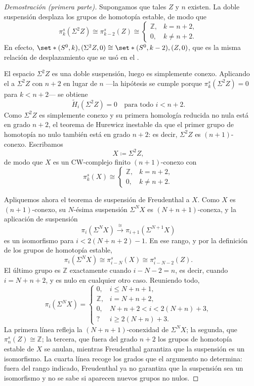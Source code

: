\begin{proof}[Demostración (primera parte)]
Supongamos que tales $Z$ y $n$ existen. La doble suspensión desplaza los grupos de homotopía estable, de modo que
\[
\pi_k^s(\Sigma^2Z)\cong\pi_{k-2}^s(Z)\cong
\begin{cases}
\mathbb Z, & k=n+2,\\
0, & k\neq n+2 .
\end{cases}
\]
En efecto, $\set*{(S^0,k),(\Sigma^2Z,0)}\cong\set*{(S^0,k-2),(Z,0)}$, que es la misma relación de desplazamiento que se usó en el .

El espacio $\Sigma^2Z$ es una doble suspensión, luego es simplemente conexo. Aplicando el  a $\Sigma^2Z$ con $n+2$ en lugar de $n$ ---la hipótesis se cumple porque $\pi_k^s(\Sigma^2Z)=0$ para $k<n+2$--- se obtiene
\[
\tilde H_i(\Sigma^2Z)=0\quad\text{para todo }i<n+2 .
\]
Como $\Sigma^2Z$ es simplemente conexo y su primera homología reducida no nula está en grado $n+2$, el teorema de Hurewicz inestable da que el primer grupo de homotopía no nulo también está en grado $n+2$: es decir, $\Sigma^2Z$ es $(n+1)$-conexo. Escribamos
\[
X\coloneqq\Sigma^2Z,
\]
de modo que $X$ es un CW-complejo finito $(n+1)$-conexo con
\[
\pi_k^s(X)\cong
\begin{cases}
\mathbb Z, & k=n+2,\\
0, & k\neq n+2 .
\end{cases}
\]

Apliquemos ahora el teorema de suspensión de Freudenthal a $X$. Como $X$ es $(n+1)$-conexo, su $N$-ésima suspensión $\Sigma^NX$ es $(N+n+1)$-conexa, y la aplicación de suspensión
\[
\pi_i(\Sigma^NX)\xrightarrow{\ \cong\ }\pi_{i+1}(\Sigma^{N+1}X)
\]
es un isomorfismo para $i<2(N+n+2)-1$. En ese rango, y por la definición de los grupos de homotopía estable,
\[
\pi_i(\Sigma^NX)\cong\pi^s_{i-N}(X)\cong\pi^s_{i-N-2}(Z).
\]
El último grupo es $\mathbb Z$ exactamente cuando $i-N-2=n$, es decir, cuando $i=N+n+2$, y es nulo en cualquier otro caso. Reuniendo todo,
\[
\pi_i(\Sigma^NX)=
\begin{cases}
0, & i\le N+n+1,\\
\mathbb Z, & i=N+n+2,\\
0, & N+n+2<i<2(N+n)+3,\\
\text{?} & i\ge2(N+n)+3 .
\end{cases}
\]
La primera línea refleja la $(N+n+1)$-conexidad de $\Sigma^NX$; la segunda, que $\pi^s_n(Z)\cong\mathbb Z$; la tercera, que fuera del grado $n+2$ los grupos de homotopía estable de $X$ se anulan, mientras Freudenthal garantiza que la suspensión es un isomorfismo. La cuarta línea recoge los grados que el argumento no determina: fuera del rango indicado, Freudenthal ya no garantiza que la suspensión sea un isomorfismo y no se sabe si aparecen nuevos grupos no nulos.


\end{proof}
